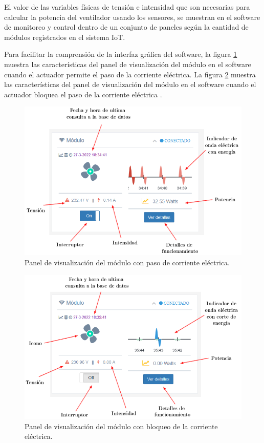 El valor de las variables físicas de tensión e intensidad que son necesarias para calcular la  potencia del ventilador usando los sensores, se muestran en el software de monitoreo y control dentro de un conjunto de paneles según la cantidad de módulos registrados en el sistema IoT.

Para facilitar la comprensión de la interfaz gráfica del software, la figura \ref{fig:test-panel5} muestra las características del panel de visualización del módulo en el software cuando el actuador permite el paso de la corriente eléctrica. La figura \ref{fig:test-panel4} muestra las características del panel de visualización del módulo en el software cuando el actuador bloquea el paso de la corriente eléctrica .

\begin{figure}[htpb]
\centering 
\includegraphics[width=1.0\textwidth]{./Figures/test/consumo/panel5.png}
\caption{Panel de visualización del módulo con paso de corriente eléctrica.}
\label{fig:test-panel5}
\end{figure}


\begin{figure}[htpb]
\centering 
\includegraphics[width=1.0\textwidth]{./Figures/test/consumo/panel4.png}
\caption{Panel de visualización del módulo con bloqueo de la corriente eléctrica.}
\label{fig:test-panel4}
\end{figure}

